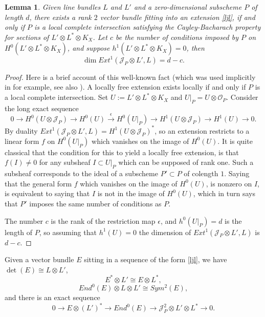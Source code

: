 \documentclass{amsart}
\theoremstyle{plain}
\newtheorem{lemma}[theorem]{Lemma}
\numberwithin{equation}{section}
\begin{document}
\begin{lemma}
\label{totallysuper}
Given line bundles $L$ and $L'$ and a zero-dimensional subscheme $P$ of length $d$, 
there exists a rank $2$
vector bundle fitting into an extension \eqref{ljl}, if and only if $P$ is
a local complete intersection
satisfying the Cayley-Bacharach property  
for sections of $L'\otimes L^{\ast} \otimes K_X$. 
Let $c$ be the number of
conditions imposed by $P$ on $H^0(L'\otimes L^{\ast} \otimes K_X)$, 
and suppose $h^1(L'\otimes L^{\ast}\otimes K_X)=0$, then
$$
\dim Ext ^1({{\mathcal J}} _P\otimes L', L) = d-c.
$$
\end{lemma}
\begin{proof}
Here is a brief account of this well-known fact (which was used implicitly in
\cite[(3.29)]{OGradyBasic} for example, see also \cite{Nijsse}). 
A locally free extension
exists locally if and only if $P$ is a local complete intersection. 
Set $U:= L'\otimes L^{\ast} \otimes K_X$ and $U|_P=U\otimes {{\mathcal O}} _P$. 
Consider the
long exact sequence
$$
0\rightarrow H^0(U\otimes {{\mathcal J}} _P)\rightarrow H^0(U)
\stackrel{\epsilon}{\rightarrow} H^0(U|_P)
\rightarrow H^1(U\otimes {{\mathcal J}} _P)\rightarrow H^1(U)\rightarrow 0.
$$
By duality $Ext ^1({{\mathcal J}} _P\otimes L', L)=H^1(U\otimes {{\mathcal J}} _P)^{\ast}$, so an
extension restricts to
a linear form $f$ on $H^0(U|_P)$
which vanishes on the image of $H^0(U)$. It is quite classical 
that the condition for this to yield a locally free extension, is that $f(I)\neq 0$
for any subsheaf $I\subset U|_P$ which can
be supposed of rank one. Such a subsheaf corresponds to the ideal of a subscheme
$P'\subset P$ of colength $1$. Saying that the general form $f$ which vanishes on
the image of $H^0(U)$, is nonzero on $I$, is equivalent to
saying that $I$ is not in the image of $H^0(U )$, which in turn says that 
$P'$ imposes the same number of conditions as $P$. 

The number $c$ is the rank of the restriction map $\epsilon$, and $h^0(U|_P)=d$ is
the length of $P$, so assuming that $h^1(U)=0$ the dimension of 
$Ext ^1({{\mathcal J}} _P\otimes L', L)$ is $d-c$. 
\end{proof}

Given a vector bundle $E$ sitting in a sequence of the form \eqref{ljl},
we have $\det (E)\cong L\otimes L'$, 
$$
E^{\ast} \otimes L' \cong E \otimes L^{\ast},
$$
$$
End ^0(E)\otimes L \otimes L' \cong Sym ^2(E) ,
$$
and there is an exact sequence
\begin{equation}
\label{elsub}
0\rightarrow E \otimes (L')^{\ast}
\rightarrow End ^0(E)\rightarrow {{\mathcal J}} _P^2\otimes L'\otimes L^{\ast} \rightarrow 0.
\end{equation}
\end{document}
